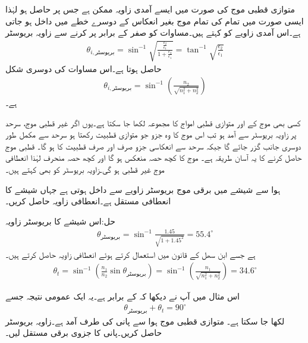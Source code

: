 متوازی قطبی موج کی صورت میں ایسے آمدی زاویہ ممکن ہے جس پر   حاصل ہو لہٰذا ایسی صورت میں تمام کی تمام موج بغیر انعکاس کے دوسرے خطے میں داخل ہو جاتی ہے۔اس آمدی زاویے کو  کہتے ہیں۔مساوات  کو صفر کے برابر پر کرنے سے زاویہ بریوسٹر 
\begin{align}
\theta_{i,\text{بریوسٹر}} =\sin^{-1} \sqrt{\frac{\frac{\epsilon_2}{\epsilon_1}}{1+\frac{\epsilon_2}{\epsilon_1}}}=\tan^{-1} \sqrt{\frac{\epsilon_2}{\epsilon_1}}
\end{align} 
حاصل ہوتا ہے۔اس مساوات کی دوسری شکل
\begin{align}
\theta_{i,\text{بریوسٹر}}= \sin^{-1} \left(\frac{n_2}{\sqrt{n_1^2+n_2^2}}\right)
\end{align}
ہے۔

کسی بھی موج کے   اور متوازی قطبی امواج کا مجموعہ لکھا جا سکتا ہے۔یوں اگر غیر قطبی موج، سرحد پر  زاویہ بریوسٹر سے آمد ہو تب اس موج کا وہ جزو جو متوازی قطبیت رکھتا ہو سرحد سے مکمل طور دوسری جانب گزر جائے گا جبکہ سرحد سے انعکاسی جزو صرف اور صرف   قطبیت  کا ہو گا۔ قطبی موج حاصل کرنے کا یہ آسان طریقہ ہے۔  موج کا کچھ حصہ منعکس ہو گا اور کچھ حصہ منحرف لہٰذا انعطافی موج غیر قطبی ہو گی۔زاویہ بریوسٹر کو  بھی کہتے ہیں۔  

ہوا سے شیشے  میں برقی موج بریوسٹر زاویے سے داخل ہوتی ہے جہاں شیشے کا انعطافی مستقل  ہے۔انعطافی زاویہ حاصل کریں۔

حل:اس شیشے کا بریوسٹر زاویہ
\begin{align*}
\theta_{\text{بریوسٹر}} = \sin^{-1} \frac{1.45}{\sqrt{1+1.45^2}}=55.4^{\circ}
\end{align*}
ہے جسے ابن سھل کے قانون میں استعمال کرتے ہوئے انعطافی زاویہ حاصل کرتے ہیں۔
\begin{align*}
\theta_t=\sin^{-1} \left(\frac{n_1}{n_2} \sin \theta_{\text{بریوسٹر}} \right)=\sin^{-1} \left(\frac{n_1}{\sqrt{n_1^2+n_2^2}}\right)=34.6^{\circ}
\end{align*}

اس مثال میں آپ نے دیکھا کہ  کے برابر ہے۔یہ ایک عمومی نتیجہ جسے
\begin{align}
\theta_{\text{بریوسٹر}} +\theta_{t}=90^{\circ}
\end{align}
لکھا جا سکتا ہے۔
متوازی قطبی موج ہوا سے پانی کی طرف آمد ہے۔زاویہ بریوسٹر حاصل کریں۔پانی کا جزوی برقی مستقل  لیں۔

